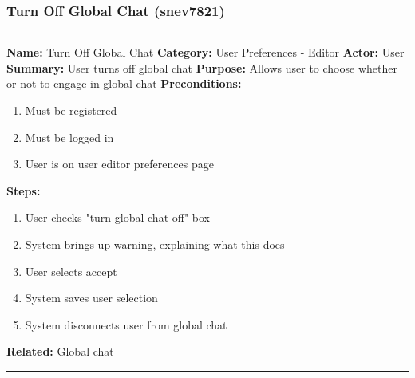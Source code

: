 \documentclass[11pt]{report}
\begin{document}
\subsubsection{Turn Off Global Chat (snev7821)}
\vspace{2pt}
\hrule
\vspace{8pt}
	\noindent\textbf{Name:} Turn Off Global Chat \newline
	\textbf{Category:} User Preferences - Editor  \newline
	\textbf{Actor:} User \newline
	\textbf{Summary:} User turns off global chat \newline
	\textbf{Purpose:} Allows user to choose whether or not to engage in global chat \newline
	\textbf{Preconditions:}
	\begin{enumerate}
		\item Must be registered
		\item Must be logged in
		\item User is on user editor preferences page
	\end{enumerate}
	\textbf{Steps:}
	\begin{enumerate}
		\item User checks "turn global chat off" box
		\item System brings up warning, explaining what this does
		\item User selects accept
		\item System saves user selection
		\item System disconnects user from global chat
	\end{enumerate}
	\textbf{Related:} Global chat
\vspace{8pt}
\hrule
\newpage
\end{document}
